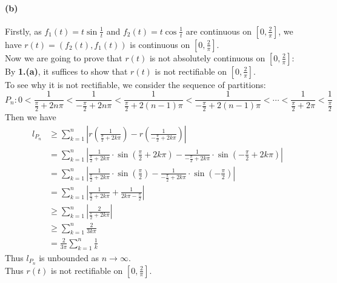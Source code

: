 \documentclass{article}
\begin{document}
\paragraph[short]{(b)}{
Firstly, as $f_1(t)=t\sin\frac{1}{t}$ and $f_2(t)=t\cos\frac{1}{t}$ are continuous on $\left[0,\frac{2}{\pi}\right]$,
 we have $r(t)=(f_2(t),f_1(t))$ is continuous on $\left[0,\frac{2}{\pi}\right]$.\\
 Now we are going to prove that $r(t)$ is not absolutely continuous on $\left[0,\frac{2}{\pi}\right]$:\\
 By \textbf{1.(a)}, it suffices to show that $r(t)$ is not rectifiable on $\left[0,\frac{2}{\pi}\right]$.\\
 To see why it is not rectifiable, we consider the sequence of partitions:
$$P_n:0<\frac{1}{\frac{\pi}{2}+2n\pi}<\frac{1}{-\frac{\pi}{2}+2n\pi}<
\frac{1}{\frac{\pi}{2}+2(n-1)\pi}<\frac{1}{-\frac{\pi}{2}+2(n-1)\pi}<\cdots
<\frac{1}{\frac{\pi}{2}+2\pi}<\frac{1}{\frac{\pi}{2}}$$
Then we have
\begin{align*}
    l_{P_n}&\geq \sum_{k=1}^{n}\left|r\left(\frac{1}{\frac{\pi}{2}+2k\pi}\right)
    -r\left(\frac{1}{-\frac{\pi}{2}+2k\pi}\right)\right|    \\
    &=\sum_{k=1}^{n}\left|\frac{1}{\frac{\pi}{2}+2k\pi}\cdot\sin\left(\frac{\pi}{2}+2k\pi\right)-\frac{1}
    {-\frac{\pi}{2}+2k\pi}\cdot\sin\left(-\frac{\pi}{2}+2k\pi\right)\right|\\
    &=\sum_{k=1}^{n}\left|\frac{1}{\frac{\pi}{2}+2k\pi}\cdot\sin\left(\frac{\pi}{2}\right)-\frac{1}
    {-\frac{\pi}{2}+2k\pi}\cdot\sin\left(-\frac{\pi}{2}\right)\right|\\
    &=\sum_{k=1}^{n}\left|\frac{1}{\frac{\pi}{2}+2k\pi}+\frac{1}
    {2k\pi-\frac{\pi}{2}}\right|\\
    &\geq \sum_{k=1}^{n}\left|\frac{2}{\frac{\pi}{2}+2k\pi}\right|\\
    &\geq \sum_{k=1}^{n}\frac{2}{3k\pi}\\
    &=\frac{2}{3\pi}\sum_{k=1}^{n}\frac{1}{k}
\end{align*}
Thus $l_{P_n}$ is unbounded as $n\to \infty$.\\
Thus $r(t)$ is not rectifiable on $\left[0,\frac{2}{\pi}\right]$.\\


}
\end{document}
